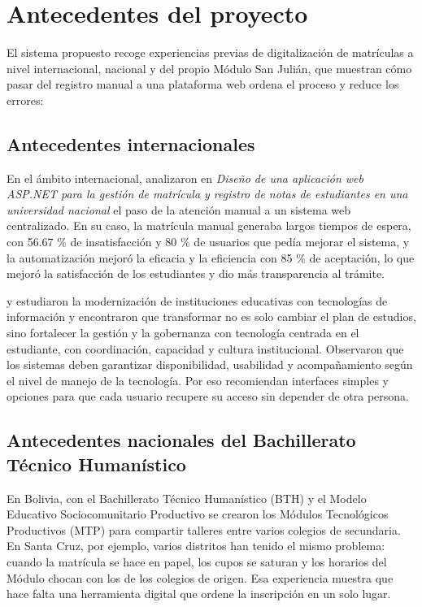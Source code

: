 \section{Antecedentes del proyecto}
\label{sec:antecedentes}

El sistema propuesto recoge experiencias previas de digitalización de matrículas a nivel internacional, nacional y del propio Módulo San Julián, que muestran cómo pasar del registro manual a una plataforma web ordena el proceso y reduce los errores:

\subsection{Antecedentes internacionales}

En el ámbito internacional, \textcite{leonvelarde2024} analizaron en \textit{Diseño de una aplicación web ASP.NET para la gestión de matrícula y registro de notas de estudiantes en una universidad nacional} el paso de la atención manual a un sistema web centralizado. En su caso, la matrícula manual generaba largos tiempos de espera, con 56.67 \% de insatisfacción y 80 \% de usuarios que pedía mejorar el sistema, y la automatización mejoró la eficacia y la eficiencia con 85 \% de aceptación, lo que mejoró la satisfacción de los estudiantes y dio más transparencia al trámite.

\textcite{unesco2023} y \textcite{unesco2024} estudiaron la modernización de instituciones educativas con tecnologías de información y encontraron que transformar no es solo cambiar el plan de estudios, sino fortalecer la gestión y la gobernanza con tecnología centrada en el estudiante, con coordinación, capacidad y cultura institucional. Observaron que los sistemas deben garantizar disponibilidad, usabilidad y acompañamiento según el nivel de manejo de la tecnología. Por eso recomiendan interfaces simples y opciones para que cada usuario recupere su acceso sin depender de otra persona.

\subsection{Antecedentes nacionales del Bachillerato Técnico Humanístico}

En Bolivia, con el Bachillerato Técnico Humanístico (BTH) y el Modelo Educativo Sociocomunitario Productivo se crearon los Módulos Tecnológicos Productivos (MTP) para compartir talleres entre varios colegios de secundaria. En Santa Cruz, por ejemplo, varios distritos han tenido el mismo problema: cuando la matrícula se hace en papel, los cupos se saturan y los horarios del Módulo chocan con los de los colegios de origen. Esa experiencia muestra que hace falta una herramienta digital que ordene la inscripción en un solo lugar.

